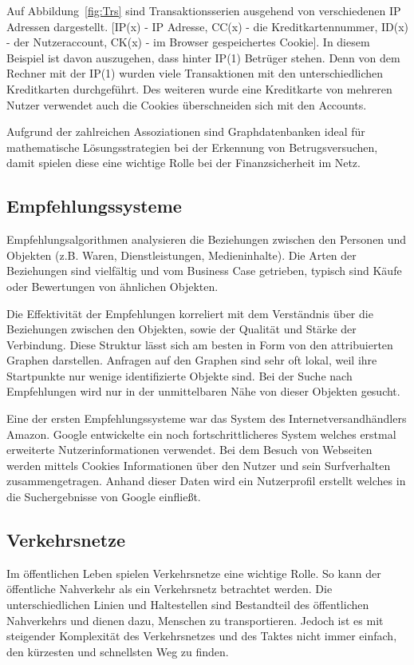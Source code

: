Auf Abbildung~\ref{fig:Trs} sind Transaktionsserien ausgehend von verschiedenen IP Adressen dargestellt. [IP(x) - IP Adresse, CC(x) - die Kreditkartennummer, ID(x) - der Nutzeraccount, CK(x) - im Browser gespeichertes Cookie]. In diesem Beispiel ist davon auszugehen, dass hinter IP(1) Betrüger stehen. Denn von dem Rechner mit der IP(1) wurden viele Transaktionen mit den unterschiedlichen Kreditkarten durchgeführt. Des weiteren wurde eine Kreditkarte von mehreren Nutzer verwendet auch die Cookies überschneiden sich mit den Accounts. \cite{Betrugserkennung}

Aufgrund der zahlreichen Assoziationen sind Graphdatenbanken ideal für mathematische Lösungsstrategien bei der Erkennung von Betrugsversuchen, damit spielen diese eine wichtige Rolle bei der Finanzsicherheit im Netz.

\subsection{Empfehlungssysteme}
Empfehlungsalgorithmen analysieren die Beziehungen zwischen den Personen und Objekten (z.B. Waren, Dienstleistungen, Medieninhalte). Die Arten der Beziehungen sind vielfältig und vom Business Case getrieben, typisch sind Käufe oder Bewertungen von ähnlichen Objekten.

Die Effektivität der Empfehlungen korreliert mit dem Verständnis über die Beziehungen zwischen den Objekten, sowie der Qualität und Stärke der Verbindung. Diese Struktur lässt sich am besten in Form von den attribuierten Graphen darstellen. Anfragen auf den Graphen sind sehr oft lokal, weil ihre Startpunkte nur wenige identifizierte Objekte sind. Bei der Suche nach Empfehlungen wird nur in der unmittelbaren Nähe von dieser Objekten gesucht.

Eine der ersten Empfehlungssysteme war das System des Internetversandhändlers Amazon. Google entwickelte ein noch fortschrittlicheres System welches erstmal erweiterte Nutzerinformationen verwendet. Bei dem Besuch von Webseiten werden mittels Cookies Informationen über den Nutzer und sein Surfverhalten zusammengetragen. Anhand dieser Daten wird ein Nutzerprofil erstellt welches in die Suchergebnisse von Google einfließt. 
\cite[p.~107]{GraphDB}

\subsection{Verkehrsnetze}
Im öffentlichen Leben spielen Verkehrsnetze eine wichtige Rolle. So kann der öffentliche Nahverkehr als ein Verkehrsnetz betrachtet werden. Die unterschiedlichen Linien und Haltestellen sind Bestandteil des öffentlichen Nahverkehrs und dienen dazu, Menschen zu transportieren. Jedoch ist es mit steigender Komplexität des Verkehrsnetzes und des Taktes nicht immer einfach, den kürzesten und schnellsten Weg zu finden.

